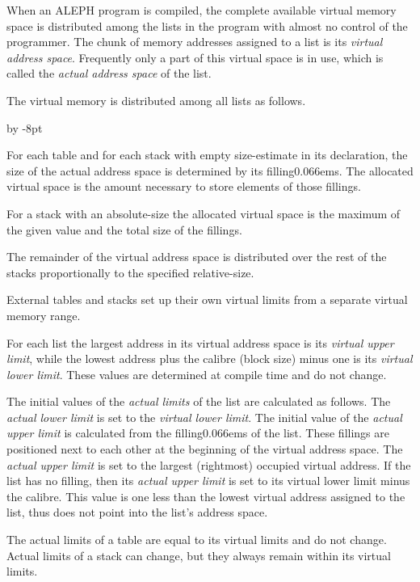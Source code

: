 \documentclass{article}
\newcommand\g[1]{{\color{blue!50!black}\sf #1}}
\renewenvironment{itemize}{\begin{list}{}{%
\advance\leftmargin by -8pt%
\setlength\itemsep{0ex plus 0.2ex}%
\setlength\partopsep{3pt}%
\setlength\topsep{2pt plus 2pt}%
\setlength\parsep{0pt plus 2pt}%
}}{\end{list}}
\renewcommand\/{\kern 0.066em}
\newcommand\A{{\sf ALEPH}}
\begin{document}
When an \A{} program is compiled, the complete available virtual memory
space is distributed among the lists in the program with almost no control
of the programmer. The chunk of memory addresses assigned to a list is its
\emph{virtual address space}. Frequently only a part of this virtual space
is in use, which is called the \emph{actual address space} of the list.

The virtual memory is distributed among all lists as follows.
\begin{itemize}
\item[a)] For each table and for each stack with empty \g{size-estimate} 
in its declaration, the
size of the actual address space is determined by its \g{filling}\/s. The
allocated virtual space is the amount necessary to store elements of those
fillings.
\item[b)] For a stack with an \g{absolute-size} the allocated virtual space
is the maximum of the given value and the total size of the fillings.
\item[c)] The remainder of the virtual address space is distributed over the
rest of the stacks proportionally to the specified \g{relative-size}.
\item[d)] External tables and stacks set up their own virtual limits from
a separate virtual memory range.
\end{itemize}
For each list the largest address in its virtual address space is its
\emph{virtual upper limit}, while the lowest address plus the \g{calibre}
(block size) minus one is its \emph{virtual lower limit}. These values are
determined at compile time and do not change.

The initial values of the \emph{actual limits} of the list are calculated as
follows. The \emph{actual lower limit} is set to the \emph{virtual lower
limit}. The initial value of the \emph{actual upper limit} is calculated
from the \g{filling}\/s of the list. These fillings are positioned next to
each other at the beginning of the virtual address space. The \emph{actual
upper limit} is set to the largest (rightmost) occupied virtual address. If
the list has no \g{filling}, then its \emph{actual upper limit} is set to
its virtual lower limit minus the \g{calibre}. This value is one less than the
lowest virtual address assigned to the list, thus does not point into the
list's address space.

The actual limits of a table are equal to its virtual limits and do not
change. Actual limits of a stack can change, but they always remain within
its virtual limits.
\end{document}
